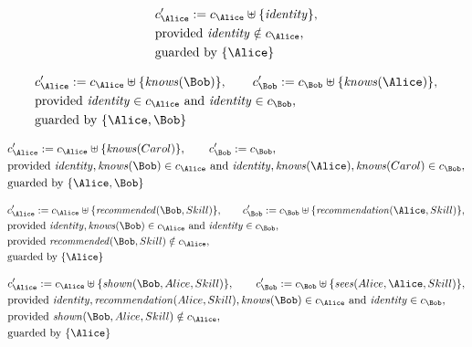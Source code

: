 \begin{align*}
&
c'_
{
\Alice
}
 := 
c_
{
\Alice
}
 \uplus 
\{
\mathit{
identity
}
\}
,\\
&
\text{provided } 
\mathit{
identity
}
 \notin c_
{
\Alice
}
,\\
&
\text{guarded by } \{
\Alice
\}
\end{align*}

\begin{align*}
&
c'_
{
\Alice
}
 := 
c_
{
\Alice
}
 \uplus 
\{
\mathit{
knows
}
(
\Bob
)
\}
, \qquad 
c'_
{
\Bob
}
 := 
c_
{
\Bob
}
 \uplus 
\{
\mathit{
knows
}
(
\Alice
)
\}
,\\
&
\text{provided } 
\mathit{
identity
}
 \in c_
{
\Alice
}
 \text{ and } 
\mathit{
identity
}
 \in c_
{
\Bob
}
,\\
&
\text{guarded by } \{
\Alice
,
\Bob
\}
\end{align*}

\begin{align*}
&
c'_
{
\Alice
}
 := 
c_
{
\Alice
}
 \uplus 
\{
\mathit{
knows
}
(
Carol
)
\}
, \qquad 
c'_
{
\Bob
}
 := 
c_
{
\Bob
}
,\\
&
\text{provided } 
\mathit{
identity
}
,
\mathit{
knows
}
(
\Bob
)
 \in c_
{
\Alice
}
 \text{ and } 
\mathit{
identity
}
,
\mathit{
knows
}
(
\Alice
)
,
\mathit{
knows
}
(
Carol
)
 \in c_
{
\Bob
}
,\\
&
\text{guarded by } \{
\Alice
,
\Bob
\}
\end{align*}

\begin{align*}
&
c'_
{
\Alice
}
 := 
c_
{
\Alice
}
 \uplus 
\{
\mathit{
recommended
}
(
\Bob
,
Skill
)
\}
, \qquad 
c'_
{
\Bob
}
 := 
c_
{
\Bob
}
 \uplus 
\{
\mathit{
recommendation
}
(
\Alice
,
Skill
)
\}
,\\
&
\text{provided } 
\mathit{
identity
}
,
\mathit{
knows
}
(
\Bob
)
 \in c_
{
\Alice
}
 \text{ and } 
\mathit{
identity
}
 \in c_
{
\Bob
}
,\\
&
\text{provided } 
\mathit{
recommended
}
(
\Bob
,
Skill
)
 \notin c_
{
\Alice
}
,\\
&
\text{guarded by } \{
\Alice
\}
\end{align*}

\begin{align*}
&
c'_
{
\Alice
}
 := 
c_
{
\Alice
}
 \uplus 
\{
\mathit{
shown
}
(
\Bob
,
Alice
,
Skill
)
\}
, \qquad 
c'_
{
\Bob
}
 := 
c_
{
\Bob
}
 \uplus 
\{
\mathit{
sees
}
(
Alice
,
\Alice
,
Skill
)
\}
,\\
&
\text{provided } 
\mathit{
identity
}
,
\mathit{
recommendation
}
(
Alice
,
Skill
)
,
\mathit{
knows
}
(
\Bob
)
 \in c_
{
\Alice
}
 \text{ and } 
\mathit{
identity
}
 \in c_
{
\Bob
}
,\\
&
\text{provided } 
\mathit{
shown
}
(
\Bob
,
Alice
,
Skill
)
 \notin c_
{
\Alice
}
,\\
&
\text{guarded by } \{
\Alice
\}
\end{align*}
